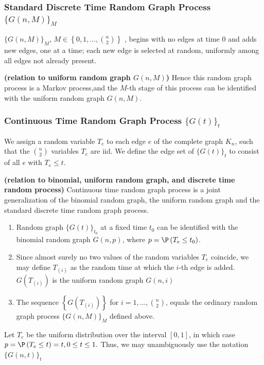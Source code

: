 \documentclass{article}
\newcommand{\bfs}[1]{\textbf{({#1}) }}
\begin{document}
\subsubsection{Standard Discrete Time Random Graph Process  $\{ G (n, M)\}_{M}$}
 \begin{defa}\label{defgnm}
 $\{ G (n, M)\}_{M}$, $M\in \left\{0,1, \ldots,\binom{n}{2}\right\}$ , begins with no edges at time $0$ and adds new edges, one at a time; each new edge is selected at random, uniformly among all edges not already present. 
 \end{defa}
 \begin{rema}{\bfs{relation to uniform random graph $G (n, M)$}}
 Hence this random graph process is a Markov process,and the $M$-th stage of this process can be identified with the uniform random graph $G (n, M)$.
 \end{rema}
\subsubsection{Continuous Time Random Graph Process $\{G(t)\}_{t}$}
\begin{defa}
We assign a random variable $T_{e}$ to each edge $e$ of the complete graph $K_{n}$, such that the $\binom{n}{2}$ variables $T_{e}$ are \gls{iid}. We define the edge set of $\{G(t)\}_{t}$ to consist of all $e$ with $T_{e} \leq t .$
\end{defa}
\begin{rema}{\bfs{relation to binomial, uniform random graph, and discrete time random process}}
Continuous time random graph process is a joint generalization of the binomial random graph, the uniform random graph and the standard discrete time random graph process.
\begin{enumerate}
    \item Random graph $\{G(t)\}_{t_{0}}$ at a fixed time $t_{0}$ can be identified with the binomial random graph $G (n, p)$, where $p= \P \left(T_{e} \leq t_{0}\right)$.
    \item Since almost surely no two values of the random variables $T_{e}$ coincide, we may define $T_{(i)}$ as the random time at which the $i$-th edge is added. $G \left(T_{(i)}\right)$ is the uniform random graph $G (n, i)$
    \item The sequence $\left\{ G \left(T_{(i)}\right)\right\}$ for $i=1, \ldots,\binom{n}{2}$, equals the ordinary random graph process $\{G(n, M)\}_{M}$ defined above.
\end{enumerate}
\end{rema}
\begin{exma}
 Let $T_e$ be the uniform distribution over the interval $[0,1]$, in which case $p=\P \left(T_{e} \leq t\right)=t, 0 \leq t \leq 1 .$ Thus, we may unambiguously use the notation $\{ G (n, t)\}_{t}$
\end{exma}
 
\end{document}
